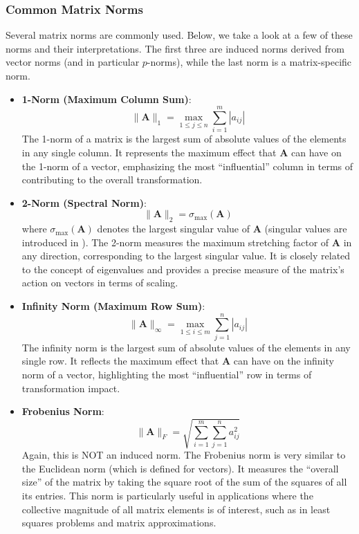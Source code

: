 \subsubsection{Common Matrix Norms}
Several matrix norms are commonly used. Below, we take a look at a few of these norms and their interpretations. The first three are induced norms derived from vector norms (and in particular $p$-norms), while the last norm is a matrix-specific norm.
\begin{itemize}
    \item \textbf{1-Norm (Maximum Column Sum)}:
    \begin{equation*}
        \|\mathbf{A}\|_1 = \max_{1 \leq j \leq n} \sum_{i=1}^m |a_{ij}|
    \end{equation*}
    The 1-norm of a matrix is the largest sum of absolute values of the elements in any single column. It represents the maximum effect that $ \mathbf{A} $ can have on the 1-norm of a vector, emphasizing the most  ``influential'' column in terms of contributing to the overall transformation.

    \item \textbf{2-Norm (Spectral Norm)}:
    \begin{equation*}
        \|\mathbf{A}\|_2 = \sigma_{\max}(\mathbf{A})
    \end{equation*}
    where $ \sigma_{\max}(\mathbf{A}) $ denotes the largest singular value of $ \mathbf{A} $ (singular values are introduced in ). The 2-norm measures the maximum stretching factor of $ \mathbf{A} $ in any direction, corresponding to the largest singular value. It is closely related to the concept of eigenvalues and provides a precise measure of the matrix's action on vectors in terms of scaling.
    
    \item \textbf{Infinity Norm (Maximum Row Sum)}:
    \begin{equation*}
        \|\mathbf{A}\|_\infty = \max_{1 \leq i \leq m} \sum_{j=1}^n |a_{ij}|
    \end{equation*}
    The infinity norm is the largest sum of absolute values of the elements in any single row. It reflects the maximum effect that $ \mathbf{A} $ can have on the infinity norm of a vector, highlighting the most        ``influential'' row in terms of transformation impact.
    
    \item \textbf{Frobenius Norm}:
    \begin{equation*}
        \|\mathbf{A}\|_F = \sqrt{\sum_{i=1}^m \sum_{j=1}^n a_{ij}^2}
    \end{equation*}
    Again, this is NOT an induced norm. The Frobenius norm is very similar to the Euclidean norm (which is defined for vectors). It measures the ``overall size'' of the matrix by taking the square root of the sum of the squares of all its entries. This norm is particularly useful in applications where the collective magnitude of all matrix elements is of interest, such as in least squares problems and matrix approximations.
\end{itemize}

